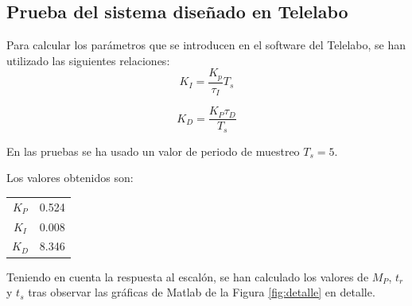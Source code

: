 \documentclass[a4paper]{article}
\begin{document}
\subsection{Prueba del sistema diseñado en Telelabo}

Para calcular los parámetros que se introducen en el software del Telelabo, se han utilizado las siguientes relaciones:
\begin{equation}
	K_I=\frac{K_p}{\tau_I} T_s
\end{equation}

\begin{equation}
	K_{D}=\frac{K_P \tau_{D}}{T_s}
\end{equation}

En las pruebas se ha usado un valor de periodo de muestreo $T_s=5$.

Los valores obtenidos son:
\begin{center}
	\begin{tabular}{c|c}
		$K_P$ & 0.524 \\
		$K_I$ & 0.008 \\
		$K_{D}$ & 8.346 \\
	\end{tabular}
\end{center}


Teniendo en cuenta la respuesta al escalón, se han calculado los valores de $M_P$, $t_r$ y $t_s$ tras observar las gráficas de Matlab de la Figura \ref{fig:detalle} en detalle. 
\end{document}
